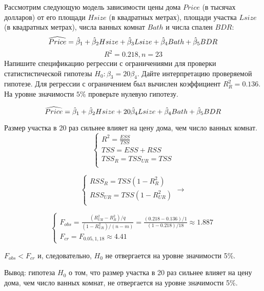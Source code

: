 \begin{problem}
Рассмотрим следующую модель зависимости цены дома $Price$ (в тысячах долларов) от его площади $Hsize$ (в квадратных метрах), площади участка $Lsize$ (в квадратных метрах), числа ванных комнат $Bath$ и числа спален $BDR$:
\[
\widehat{Price} = \hat{\beta}_1 + \hat{\beta}_2 Hsize + \hat{\beta}_3 Lsize + \hat{\beta}_4 Bath + \hat{\beta}_5 BDR
\]
\[
R^2 = 0.218, n = 23
\]
Напишите спецификацию регрессии с ограничениями для проверки статистистической гипотезы $H_0: \beta_3 = 20\beta_4$. Дайте интерпретацию проверяемой гипотезе. Для регрессии с ограничением был вычислен коэффициент $R_{R}^2 = 0.136$. На уровне значимости $5\%$ проверьте нулевую гипотезу.


\begin{sol}
\[
\widehat{Price}= \hat{\beta}_1+\hat{\beta}_2 Hsize+20\hat{\beta}_4 Lsize+\hat{\beta}_4 Bath + \hat{\beta}_5 BDR
\]

Размер участка в 20 раз сильнее влияет на цену дома, чем число ванных комнат.
\[
\begin{cases}
R^2=\frac{ESS}{TSS}\\
TSS=ESS+RSS\\
TSS_R=TSS_{UR}=TSS\\
\end{cases}
\]

\[
\begin{cases}
RSS_{R}=TSS(1-R^2_{R})\\
RSS_{UR}=TSS(1-R^2_{UR})\\
\end{cases} \to
\]

\[
\begin{cases}
F_{obs}=\frac{(R_{UR}^2-R_{R}^2)/q}{(1-R^2_{UR})/(n-m)}=\frac{(0.218-0.136)/1}{(1-0.218)/18}\approx 1.887\\
F_{cr}= F_{0.05,1,18}\approx 4.41
\end{cases}
\]

$F_{obs}<F_{cr}$ и, следовательно, $H_0$ не отвергается на уровне значимости 5\%.

Вывод: гипотеза $H_0$ о том, что размер участка в 20 раз сильнее влияет на цену дома, чем число ванных комнат, не отвергается на уровне значимости 5\%.
\end{sol}
\end{problem}



